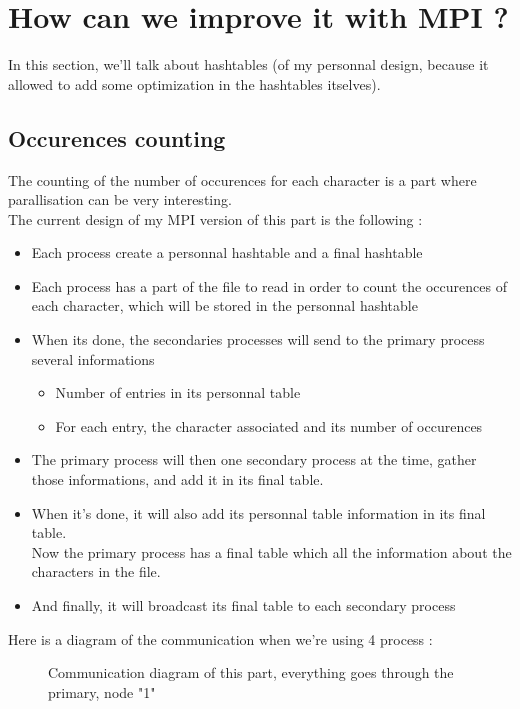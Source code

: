 \section{How can we improve it with MPI ?}
In this section, we'll talk about hashtables (of my personnal design, because it allowed to add some optimization in the hashtables itselves).

\subsection{Occurences counting}
The counting of the number of occurences for each character is a part where parallisation can be very interesting.\\
The current design of my MPI version of this part is the following :\\
\begin{itemize}
	\item Each process create a personnal hashtable and a final hashtable
	\item Each process has a part of the file to read in order to count the occurences of each character, which will be stored in the personnal hashtable
	\item When its done, the secondaries processes will send to the primary process several informations
	\begin{itemize}
		\item Number of entries in its personnal table
		\item For each entry, the character associated and its number of occurences
	\end{itemize}
	\item The primary process will then one secondary process at the time, gather those informations, and add it in its final table.
	\item When it's done, it will also add its personnal table information in its final table.\\
	Now the primary process has a final table which all the information about the characters in the file.
	\item And finally, it will broadcast its final table to each secondary process
\end{itemize}
Here is a diagram of the communication when we're using 4 process :
\begin{figure}[H]
\centering
{} 
\caption{Communication diagram of this part, everything goes through the primary, node "1"}
\label{fig:my_label}
\end{figure}

